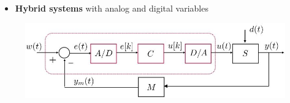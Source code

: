 \documentclass[conference]{IEEEtran}
\begin{document}
\begin{itemize}
    \item \textbf{Hybrid systems} with analog and digital variables 
\end{itemize}
\begin{figure} [h!]
    \centering
    \includegraphics[scale=0.5]{Ex2.JPG}
\end{figure}





\end{document}
